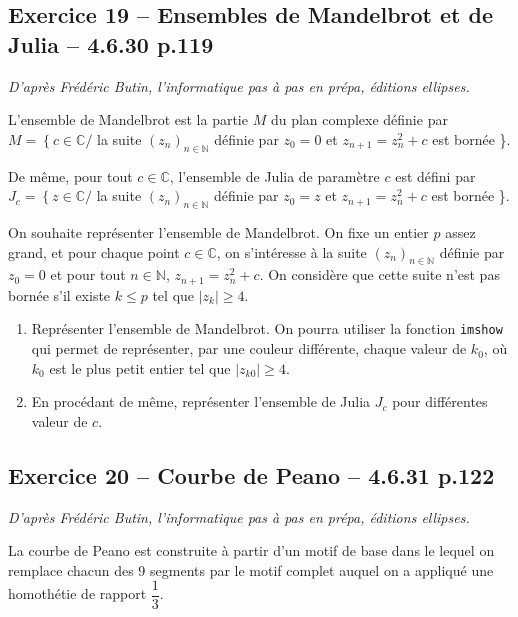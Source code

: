 \documentclass[10pt,fleqn]{article} %
\begin{document}
\begin{multicols}{2}
\subsection*{Exercice 19 -- Ensembles de Mandelbrot et de Julia -- 4.6.30 p.119}
\begin{flushright}
\textit{D'après Frédéric Butin, l'informatique pas à pas en prépa, éditions ellipses.}
\end{flushright}

L'ensemble de Mandelbrot est la partie $M$ du plan complexe définie par $M=\left\{c \in \mathbb{C} / \right.$ la suite $\left(z_n \right)_{n\in\mathbb{N}}$ définie par $z_0=0$ et $z_{n+1}=z_n^2+c$ est bornée \}.

De même, pour tout $c \in \mathbb{C}$, l'ensemble de Julia de paramètre $c$ est défini par 
$J_c=\left\{z \in \mathbb{C} / \right.$ la suite $\left(z_n \right)_{n\in\mathbb{N}}$ définie par $z_0=z$ et $z_{n+1}=z_n^2+c$ est bornée \}.

On souhaite représenter l'ensemble de Mandelbrot. On fixe un entier $p$ assez grand, et pour chaque point $c\in\mathbb{C}$, on s'intéresse à la suite $\left(z_n \right)_{n\in\mathbb{N}}$ définie par $z_0=0$ et pour tout $n\in\mathbb{N}$, $z_{n+1}=z_n^2+c$. On considère que cette suite n'est pas bornée s'il existe $k\leq p$ tel que $|z_k| \geq 4$.

\begin{enumerate} 
\item Représenter l'ensemble de Mandelbrot. On pourra utiliser la fonction \texttt{imshow} qui permet de représenter, par une couleur différente, chaque valeur de $k_0$, où $k_0$ est le plus petit entier tel que $|z_{k0}|\geq 4$.
\item En procédant de même, représenter l'ensemble de Julia $J_c$ pour différentes valeur de $c$.
\end{enumerate}

\subsection*{Exercice 20 -- Courbe de Peano -- 4.6.31 p.122}
\begin{flushright}
\textit{D'après Frédéric Butin, l'informatique pas à pas en prépa, éditions ellipses.}
\end{flushright}

La courbe de Peano est construite à partir d'un motif de base dans le lequel on remplace chacun des 9 segments par le motif complet auquel on a appliqué une homothétie de rapport $\dfrac{1}{3}$. 


\end{multicols}
\end{document}

